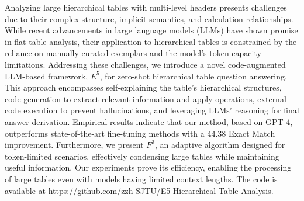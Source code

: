 Analyzing large hierarchical tables with multi-level headers presents challenges due to their complex structure, implicit semantics, and calculation relationships. While recent advancements in large language models (LLMs) have shown promise in flat table analysis, their application to hierarchical tables is constrained by the reliance on manually curated exemplars and the model's token capacity limitations. Addressing these challenges, we introduce a novel code-augmented LLM-based framework, $E^5$, for zero-shot hierarchical table question answering. This approach encompasses self-explaining the table's hierarchical structures, code generation to extract relevant information and apply operations, external code execution to prevent hallucinations, and leveraging LLMs' reasoning for final answer derivation. Empirical results indicate that our method, based on GPT-4, outperforms state-of-the-art fine-tuning methods with a 44.38 Exact Match improvement. Furthermore, we present $F^3$, an adaptive algorithm designed for token-limited scenarios, effectively condensing large tables while maintaining useful information. Our experiments prove its efficiency, enabling the processing of large tables even with models having limited context lengths. The code is available at https://github.com/zzh-SJTU/E5-Hierarchical-Table-Analysis.